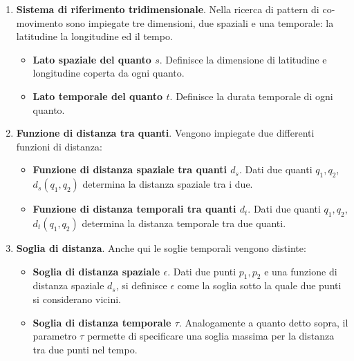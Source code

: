\begin{enumerate}

\item \textbf{Sistema di riferimento tridimensionale}.
Nella ricerca di pattern di co-movimento sono impiegate tre dimensioni, due spaziali e una temporale: la latitudine la longitudine ed il tempo.

\begin{itemize}
     \item \textbf{Lato spaziale del quanto \(s\)}.
  Definisce la dimensione di latitudine e longitudine coperta da ogni quanto.
  
  \item \textbf{Lato temporale del quanto \(t\)}.
  Definisce la durata temporale di ogni quanto.
\end{itemize}

\item \textbf{Funzione di distanza tra quanti}.
Vengono impiegate due differenti funzioni di distanza:
\begin{itemize}

 \item \textbf{Funzione di distanza spaziale tra quanti \(d_s\)}.
  Dati due quanti \(q_{1}, q_{2}\), \(d_s(q_{1}, q_{2})\) determina la distanza spaziale tra i due.
  
   \item \textbf{Funzione di distanza temporali tra quanti \(d_t\)}.
  Dati due quanti \(q_{1}, q_{2}\), \(d_t(q_{1}, q_{2})\) determina la distanza temporale tra due quanti.
    
\end{itemize}
\item \textbf{Soglia di distanza}.
Anche qui le soglie temporali vengono distinte:
\begin{itemize}
    \item \textbf{Soglia di distanza spaziale \(\epsilon\)}.
   Dati due punti \(p_{1}, p_{2}\) e una funzione di distanza spaziale \(d_{s}\),
  si definisce \(\epsilon \) come la soglia sotto la quale due punti si considerano vicini.
  
  \item \textbf{Soglia di distanza temporale \(\tau \)}. Analogamente a quanto detto sopra, il parametro \(\tau \) permette di specificare
  una soglia massima per la distanza tra due punti nel tempo.
\end{itemize}

\end{enumerate}

